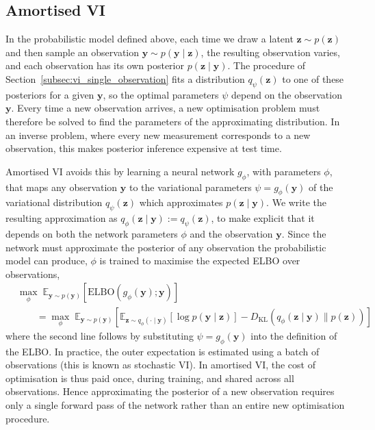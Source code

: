\documentclass[12pt,a4paper]{report}
\begin{document}
\subsection{Amortised VI}
\label{subsec:amortised_vi}
In the probabilistic model defined above, each time we draw a latent $\mathbf{z}\sim p(\mathbf{z})$ and then sample an observation $\mathbf{y}\sim p(\mathbf{y}\mid\mathbf{z})$, the resulting observation varies, and each observation has its own posterior $p(\mathbf{z}\mid\mathbf{y})$.
The procedure of Section~\ref{subsec:vi_single_observation} fits a distribution $q_{\psi}(\mathbf{z})$ to one of these posteriors for a given $\mathbf{y}$, so the optimal parameters $\psi$ depend on the observation $\mathbf{y}$. Every time a new observation arrives, a new optimisation problem must therefore be solved to find the parameters of the approximating distribution. In an inverse problem, where every new measurement corresponds to a new observation, this makes posterior inference expensive at test time.

Amortised VI avoids this by learning a neural network $g_{\phi}$, with parameters $\phi$, that maps any observation $\mathbf{y}$ to the variational parameters $\psi=g_{\phi}(\mathbf{y})$ of the variational distribution $q_{\psi}(\mathbf{z})$ which approximates $p(\mathbf{z}\mid\mathbf{y})$. We write the resulting approximation as $q_{\phi}(\mathbf{z}\mid\mathbf{y}):=q_{\psi}(\mathbf{z})$, to make explicit that it depends on both the network parameters $\phi$ and the observation $\mathbf{y}$. Since the network must approximate the posterior of any observation the probabilistic model can produce, $\phi$ is trained to maximise the expected ELBO over observations,
\begin{align}
&\max_{\phi}\;
\mathbb{E}_{\mathbf{y}\sim p(\mathbf{y})}
\left[\mathrm{ELBO}\left(g_{\phi}(\mathbf{y});\mathbf{y}\right)\right]
\nonumber
\\
&\qquad=
\max_{\phi}\;
\mathbb{E}_{\mathbf{y}\sim p(\mathbf{y})}
\left[
\mathbb{E}_{\mathbf{z}\sim q_{\phi}(\cdot\mid\mathbf{y})}
\left[\log p(\mathbf{y}\mid\mathbf{z})\right]
-
D_{\mathrm{KL}}\left(q_{\phi}(\mathbf{z}\mid\mathbf{y})\parallel p(\mathbf{z})\right)
\right]
\label{eq:amortised_objective}
\end{align}
where the second line follows by substituting $\psi=g_{\phi}(\mathbf{y})$ into the definition of the ELBO.
In practice, the outer expectation is estimated using a batch of observations (this is known as stochastic VI). In amortised VI, the cost of optimisation is thus paid once, during training, and shared across all observations. Hence approximating the posterior of a new observation requires only a single forward pass of the network rather than an entire new optimisation procedure. 
\end{document}
